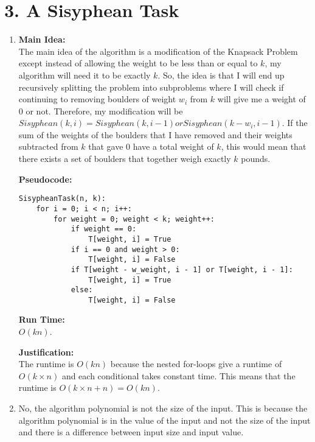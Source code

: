 \documentclass[11pt]{article}
\newenvironment{mainIdea}{\par{\bf Main Idea:}}{\smallskip}
\newenvironment{pseudocode}{\par{\bf Pseudocode:}}{\smallskip}
\newenvironment{runTime}{\par{\bf Run Time:}}{\smallskip}
\newenvironment{justification}{\par{\bf Justification:}}{\smallskip}
\begin{document}
\section*{3. A Sisyphean Task}
\begin{enumerate}[label=(\alph*)]
\item
\begin{mainIdea}
\\
The main idea of the algorithm is a modification of the Knapsack Problem except instead of allowing the weight to be less than or equal to $k$, my algorithm will need it to be exactly $k$. So, the idea is that I will end up recursively splitting the problem into subproblems where I will check if continuing to removing boulders of weight $w_i$ from $k$ will give me a weight of $0$ or not. Therefore, my modification will be $Sisyphean(k, i) = Sisyphean(k, i - 1) or Sisyphean(k - w_i, i - 1)$. If the sum of the weights of the boulders that I have removed and their weights subtracted from $k$ that gave $0$ have a total weight of $k$, this would mean that there exists a set of boulders that together weigh exactly $k$ pounds.
\end{mainIdea}
\\
\begin{pseudocode}
\begin{lstlisting}
SisypheanTask(n, k):
	for i = 0; i < n; i++:
		for weight = 0; weight < k; weight++:
			if weight == 0:
				T[weight, i] = True
			if i == 0 and weight > 0:
				T[weight, i] = False
			if T[weight - w_weight, i - 1] or T[weight, i - 1]:
				T[weight, i] = True
			else:
				T[weight, i] = False
\end{lstlisting}
\end{pseudocode}
\begin{runTime}
\\
$O(kn)$.
\end{runTime}
\\
\begin{justification}
\\
The runtime is $O(kn)$ because the nested for-loops give a runtime of $O(k \times n)$ and each conditional takes constant time. This means that the runtime is $O(k \times n + n) = O(kn)$.
\end{justification}



\item
No, the algorithm polynomial is not the size of the input. This is because the algorithm polynomial is in the value of the input and not the size of the input and there is a difference between input size and input value.
\end{enumerate}
\end{document}
